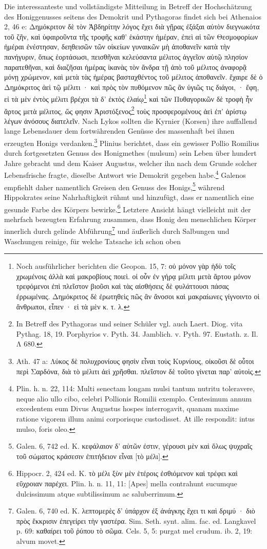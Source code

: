 \documentclass[a4paper, 11pt, oneside]{article}
\begin{document}
Die interessanteste und vollständigste Mitteilung in Betreff der Hochschätzung des Honiggenusses seitens des Demokrit und Pythagoras findet sich bei Athenaios 2, 46 e: Δημόκριτον δὲ τὸν Ἀβδηρίτην λόγος ἔχει διὰ γῇρας ἐξάξαι αὑτὸν διεγνωκότα τοῦ ζῆν, καὶ ὑφαιροῦντα τῆς τροφῆς καθ' ἑκάστην ἡμέραν, ἐπεὶ αἱ τῶν Θεσμοφορίων ἡμέραι ἐνέστησαν, δεηθεισῶν τῶν οἰκείων γυναικῶν μὴ ἀποθανεῖν κατὰ τὴν πανήγυριν, ὅπως ἑορτάσωσι, πεισθῆναι κελεύσαντα μέλιτος ἀγγεῖον αὑτῷ πλησίον παρατεθῆναι, καὶ διαζῆσαι ἡμέρας ἱκανὰς τὸν ἄνδρα τῇ ἀπὸ τοῦ μέλιτος ἀναφορᾷ μόνῃ χρώμενον, καὶ μετὰ τὰς ἡμέρας βασταχθέντος τοῦ μέλιτος ἀποθανεῖν. ἔχαιρε δὲ ὁ Δημόκριτος ἀεὶ τῷ μέλιτι · καὶ πρὸς τὸν πυθόμενον πῶς ἂν ὑγιῶς τις διάγοι, · ἔφη, εἰ τὰ μὲν ἐντὸς μέλιτι βρέχοι τὰ δ' ἐκτὸς ἐλαίῳ\footnote{Noch ausführlicher berichten die Geopon. 15, 7: οὐ μόνον γὰρ ἡδὺ τοῖς χρωμένοις ἀλλὰ καὶ μακροβίους ποιεὶ. οἱ οὖν ἐν γήρᾳ μέλιτι μετὰ ἄρτου μόνον τρεφόμενοι ἐπὶ πλεῖστον βιοῦσι καὶ τὰς αἰσθήσεις δὲ φυλάττουσι πάσας ἐρρωμένας. Δημόκριτος δὲ ἐρωτηθεὶς πῶς ἂν ἄνοσοι καὶ μακραίωνες γίγνοιντο οἱ ἄνθρωποι, εἷπεν · εἰ τὰ μὲν κ. τ. λ.} καὶ τῶν Πυθαγορικῶν δὲ τροφὴ ἦν ἄρτος μετὰ μέλιτος, ὥς φησιν Ἀριστόξενος\footnote{In Betreff des Pythagoras und seiner Schüler vgl. auch Laert. Diog. vita Pythag. 18, 19. Porphyrios v. Pyth. 34. Jamblich. v. Pyth. 97. Eustath. z. Il. Λ 680.} τοὺς προσφερομένους ἀεὶ ἐπ' ἀρίστῳ λέγων ἀνόσους διατελεῖν. Nach Lykos sollten die Kyrnier (Korsen) ihre auffallend lange Lebensdauer dem fortwährenden Genüsse des massenhaft bei ihnen erzeugten Honigs verdanken.\footnote{Ath. 47 a: Λύκος δὲ πολυχρονίους φησὶν εἶναι τοὺς Κυρνίους, οἰκοῦσι δὲ οὗτοι περὶ Σαρδόνα, διὰ τὸ μέλιτι ἀεὶ χρῆσθαι. πλεῖστον δὲ τοῦτο γίνεται παρ' αὐτοὶς.} Plinius berichtet, dass ein gewisser Pollio Romilius durch fortgesetzten Genuss des Honigmethes (mulsum) sein Leben über hundert Jahre gebracht und dem Kaiser Augustus, welcher ihn nach dem Grunde solcher Lebensfrische fragte, dieselbe Antwort wie Demokrit gegeben habe.\footnote{Plin. h. n. 22, 114: Multi senectam longam mulsi tantum nutritu toleravere, neque alio ullo cibo, celebri Pollionis Romilii exemplo. Centesimum annum excedentem eum Divus Augustus hospes interrogavit, quanam maxime ratione vigorem illum animi corporisque custodisset. At ille respondit: intus mulso, foris oleo.} Galenos empfiehlt daher namentlich Greisen den Genuss des Honigs,\footnote{Galen. 6, 742 ed. K. κεφάλαιον δ' αὐτῶν ἐστιν, γέρουσι μὲν καὶ ὅλως ψυχραῖς τοῦ σώματος κράσεσιν ἐπιτήδειον εἶναι [τὸ μέλι].} während Hippokrates seine Nahrhaftigkeit rühmt und hinzufügt, dass er namentlich eine gesunde Farbe des Körpers bewirke.\footnote{Hippocr. 2, 424 ed. K. τὸ μέλι ξὺν μὲν ἑτέροις ἐσθιόμενον καὶ τρέφει καὶ εὔχροιαν παρέχει. Plin. h. n. 11, 11: [Apes] mella contrahunt sucumque dulcissimum atque subtilissimum ac saluberrimum.} Letztere Ansicht hängt vielleicht mit der mehrfach bezeugten Erfahrung zusammen, dass Honig den menschlichen Körper innerlich durch gelinde Abführung\footnote{Galen. 6, 740 ed. K. λεπτομερὲς δ' ὑπάρχον ἐξ ἀνάγκης ἔχει τι καὶ δριμύ · διὸ πρὸς ἔκκρισιν ἐπεγείρει τὴν γαστέρα. Sim. Seth. synt. alim. fac. ed. Langkavel p. 69: καθαίρει τοῦ ῥύπου τὸ σῶμα. Cels. 5, 5: purgat mel crudum. ib. 2, 19: alvum movet.} und äußerlich durch Salbungen und Waschungen reinige, für welche Tatsache ich schon oben 
\end{document}
